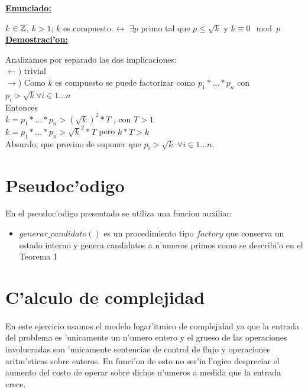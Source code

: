 \textbf{\underline{Enunciado:}\\}

$k$ ${\in {\mathbb Z}}$, $k>1$; $k$ es compuesto $\longleftrightarrow$ $\exists p$ primo tal que $p \leq \sqrt{k}$ y $k \equiv 0 \mod{p}$\\

\textbf{\underline{Demostraci'on:}\\}

Analizamos por separado las dos implicaciones: \\

$\leftarrow)$ trivial \\

$\rightarrow$) Como $k$ es compuesto se puede factorizar como $p_1*...*p_n$ con $p_i > \sqrt{k} \forall i \in {1...n}$\\

Entonces \\

$k = p_1*...*p_n > (\sqrt{k})^2*T$ , con $T>1$\\  

$k = p_1*...*p_n > \sqrt{k}^2*T$ pero $k*T > k$ \\

Absurdo, que provino de suponer que $p_i > \sqrt{k}$ $\forall i \in {1...n}$.\\

\newpage
\section{Pseudoc'odigo}

En el pseudoc'odigo presentado se utiliza una funcion auxiliar:
\begin{itemize}
\item $generar\_candidato()$ es un procedimiento tipo $factory$ que conserva un estado interno 
y genera candidatos a n'umeros primos como se describi'o en el Teorema 1
\end{itemize}

\newpage
\section{C'alculo de complejidad}
\paragraph{}
En este ejercicio usamos el modelo logar'itmico de complejidad ya que la entrada del problema es 'unicamente un
n'umero entero y el grueso de las operaciones involucradas son 'unicamente sentencias de control de flujo
y operaciones aritm'eticas sobre enteros. En funci'on de esto no ser'ia l'ogico despreciar el aumento del costo
de operar sobre dichos n'umeros a medida que la entrada crece.

